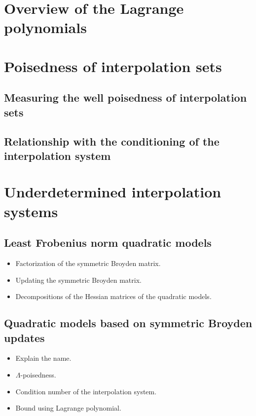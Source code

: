 \section{Overview of the Lagrange polynomials}

\section{Poisedness of interpolation sets}

\subsection{Measuring the well poisedness of interpolation sets}

\subsection{Relationship with the conditioning of the interpolation system}

\section{Underdetermined interpolation systems}
\label{sec:underdetermined-interpolation}

\subsection{Least Frobenius norm quadratic models}

\begin{itemize}
    \item Factorization of the symmetric Broyden matrix.
    \item Updating the symmetric Broyden matrix.
    \item Decompositions of the Hessian matrices of the quadratic models.
\end{itemize}

\subsection{Quadratic models based on symmetric Broyden updates}

\begin{itemize}
    \item Explain the name.
    \item $\Lambda$-poisedness.     
    \item Condition number of the interpolation system.
    \item Bound using Lagrange polynomial.
\end{itemize}
